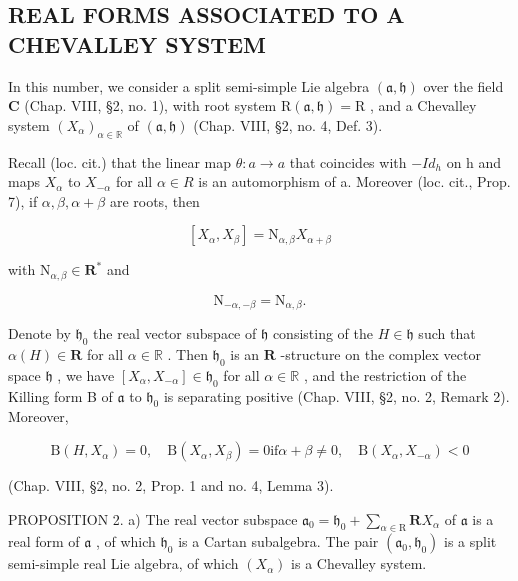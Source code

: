 \subsection{REAL FORMS ASSOCIATED TO A CHEVALLEY SYSTEM}

In this number, we consider a split semi-simple Lie algebra \((\mathfrak{a},\mathfrak{h})\) over the field \(\mathbf{C}\) (Chap. VIII, §2, no. 1), with root system \(\mathrm{R}(\mathfrak{a},\mathfrak{h}) = \mathrm{R}\) , and a Chevalley system \((X_{\alpha})_{\alpha \in \mathbb{R}}\) of \((\mathfrak{a},\mathfrak{h})\) (Chap. VIII, §2, no. 4, Def. 3).

Recall (loc. cit.) that the linear map \(\theta: a \to a\) that coincides with \(-Id_{h}\) on h and maps \(X_{\alpha}\) to \(X_{-\alpha}\) for all \(\alpha \in R\) is an automorphism of a. Moreover (loc. cit., Prop. 7), if \(\alpha, \beta, \alpha + \beta\) are roots, then

\[
[ X _ {\alpha}, X _ {\beta} ] = \mathrm{N} _ {\alpha , \beta} X _ {\alpha + \beta}\tag{3}
\]

with \(\mathrm{N}_{\alpha ,\beta}\in \mathbf{R}^*\) and

\[
\mathrm{N} _ {- \alpha , - \beta} = \mathrm{N} _ {\alpha , \beta}.\tag{4}
\]

Denote by \(\mathfrak{h}_0\) the real vector subspace of \(\mathfrak{h}\) consisting of the \(H\in \mathfrak{h}\) such that \(\alpha (H)\in \mathbf{R}\) for all \(\alpha \in \mathbb{R}\) . Then \(\mathfrak{h}_0\) is an \(\mathbf{R}\) -structure on the complex vector space \(\mathfrak{h}\) , we have \([X_{\alpha},X_{-\alpha}]\in \mathfrak{h}_0\) for all \(\alpha \in \mathbb{R}\) , and the restriction of the Killing form B of \(\mathfrak{a}\) to \(\mathfrak{h}_0\) is separating positive (Chap. VIII, §2, no. 2, Remark 2). Moreover,

\[
\mathrm{B} (H, X _ {\alpha}) = 0, \quad \mathrm{B} (X _ {\alpha}, X _ {\beta}) = 0 \text {if} \alpha + \beta \neq 0, \quad \mathrm{B} (X _ {\alpha}, X _ {- \alpha}) <   0\tag{5}
\]

(Chap. VIII, §2, no. 2, Prop. 1 and no. 4, Lemma 3).

PROPOSITION 2. a) The real vector subspace \(\mathfrak{a}_0 = \mathfrak{h}_0 + \sum_{\alpha \in \mathrm{R}} \mathbf{R}X_\alpha\) of \(\mathfrak{a}\) is a real form of \(\mathfrak{a}\) , of which \(\mathfrak{h}_0\) is a Cartan subalgebra. The pair \((\mathfrak{a}_0, \mathfrak{h}_0)\) is a split semi-simple real Lie algebra, of which \((X_\alpha)\) is a Chevalley system.

